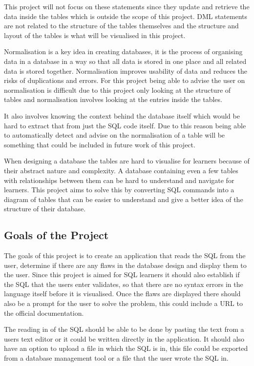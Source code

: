 This project will not focus on these statements since they update and retrieve the data inside the tables which is outside the scope of this project. DML statements are not related to the structure of the tables themselves and the structure and layout of the tables is what will be visualised in this project.

Normalisation is a key idea in creating databases, it is the process of organising data in a database in a way so that all data is stored in one place and all related data is stored together\cite{normalisation}. Normalisation improves usability of data and reduces the risks of duplications and errors. For this project being able to advise the user on normalisation is difficult due to this project only looking at the structure of tables and normalisation involves looking at the entries inside the tables. 

It also involves knowing the context behind the database itself which would be hard to extract that from just the SQL code itself. Due to this reason being able to automatically detect and advise on the normalisation of a table will be something that could be included in future work of this project.

When designing a database the tables are hard to visualise for learners because of their abstract nature and complexity. A database containing even a few tables with relationships between them can be hard to understand and navigate for learners. This project aims to solve this by converting SQL commands into a diagram of tables that can be easier to understand and give a better idea of the structure of their database.

\subsection{Goals of the Project}

The goals of this project is to create an application that reads the SQL from the user, determine if there are any flaws in the database design and display them to the user. Since this project is aimed for SQL learners it should also establish if the SQL that the users enter validates, so that there are no syntax errors in the language itself before it is visualised. Once the flaws are displayed there should also be a prompt for the user to solve the problem, this could include a URL to the official documentation. 

The reading in of the SQL should be able to be done by pasting the text from a users text editor or it could be written directly in the application. It should also have an option to upload a file in which the SQL is in, this file could be exported from a database management tool or a file that the user wrote the SQL in.

